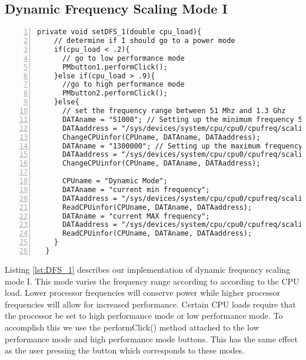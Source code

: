 \documentclass{article} %
\begin{document}
\subsection{Dynamic Frequency Scaling Mode I}
\begin{lstlisting}[float=*,caption={Dynamic Frequency Scaling Mode I},label={lst:DFS_1},numbers=left]
private void setDFS_1(double cpu_load){
    // determine if I should go to a power mode
    if(cpu_load < .2){
      // go to low performance mode
      PMbutton1.performClick();
    }else if(cpu_load > .9){
      //go to high performance mode
      PMbutton2.performClick();
    }else{
      // set the frequency range between 51 Mhz and 1.3 Ghz
      DATAname = "51000"; // Setting up the minimum frequency 51 Mhz
      DATAaddress = "/sys/devices/system/cpu/cpu0/cpufreq/scaling_min_freq";
      ChangeCPUinfor(CPUname, DATAname, DATAaddress);
      DATAname = "1300000"; // Setting up the maximum frequency at 1300 MHz
      DATAaddress = "/sys/devices/system/cpu/cpu0/cpufreq/scaling_max_freq";
      ChangeCPUinfor(CPUname, DATAname, DATAaddress);

      CPUname = "Dynamic Mode";
      DATAname = "current min frequency";
      DATAaddress = "/sys/devices/system/cpu/cpu0/cpufreq/scaling_min_freq";
      ReadCPUinfor(CPUname, DATAname, DATAaddress);
      DATAname = "current MAX frequency";
      DATAaddress = "/sys/devices/system/cpu/cpu0/cpufreq/scaling_max_freq";
      ReadCPUinfor(CPUname, DATAname, DATAaddress);
    }
  }
\end{lstlisting}
Listing \ref{lst:DFS_1} describes our implementation of dynamic frequency scaling mode I. This mode varies the frequency range according to according to the CPU load. Lower processor frequencies will conserve power while higher processor frequencies will allow for increased performance. 
Certain CPU loads require that the processor be set to high performance mode or low performance mode. To accomplish this we use the performClick() method attached to the low performance mode and high performance mode buttons. This has the same effect as the user pressing the button which corresponds to these modes.
\end{document}

